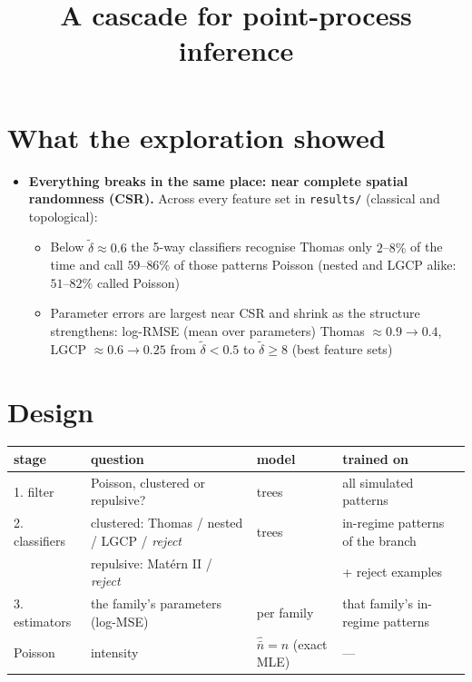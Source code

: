 \documentclass[11pt]{article}
\title{A cascade for point-process inference}
\date{}
\newcommand{\dt}{\tilde\delta}
\newcommand{\nb}{\bar n}
\begin{document}
\maketitle

\section{What the exploration showed}

\begin{itemize}
  \item \textbf{Everything breaks in the same place: near complete spatial randomness (CSR).} Across every feature set in \texttt{results/} (classical and topological):
  \begin{itemize}
    \item Below $\dt\approx0.6$ the 5-way classifiers recognise Thomas only $2$--$8\%$ of the time and call $59$--$86\%$ of those patterns Poisson (nested and LGCP alike: $51$--$82\%$ called Poisson)
    \item Parameter errors are largest near CSR and shrink as the structure strengthens: log-RMSE (mean over parameters) Thomas $\approx0.9 \to 0.4$, LGCP $\approx0.6 \to 0.25$ from $\dt<0.5$ to $\dt\ge8$ (best feature sets)
  \end{itemize}
\end{itemize}

\section{Design}

\begin{center}
\begin{tabular}{@{}llll@{}}
\toprule
stage & question & model & trained on \\
\midrule
1. filter      & Poisson, clustered or repulsive?      & trees & all simulated patterns \\
2. classifiers & clustered: Thomas / nested / LGCP / \emph{reject} & trees & in-regime patterns of the branch \\
               & repulsive: Mat\'ern II / \emph{reject}           &       & + reject examples \\
3. estimators  & the family's parameters (log-MSE)     & per family & that family's in-regime patterns \\
\midrule
Poisson        & intensity                             & $\hat{\nb}=n$ (exact MLE) & --- \\
\bottomrule
\end{tabular}
\end{center}
\end{document}
